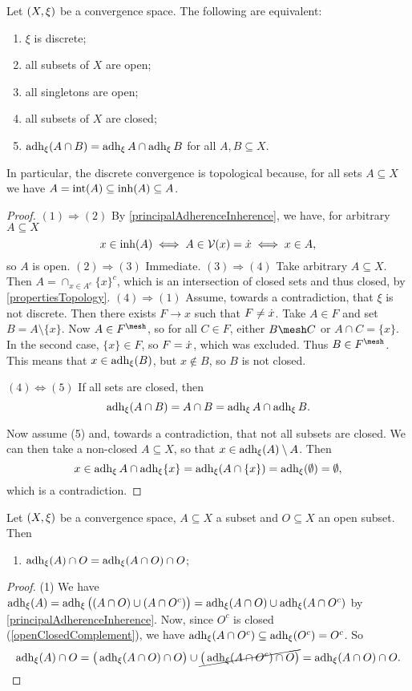 \begin{proposition} \label{discreteTopologyCharacterisation}
Let $\sSet{X,\xi}$ be a convergence space. The following are equivalent:
\begin{enumerate}
\item $\xi$ is discrete;
\item all subsets of $X$ are open;
\item all singletons are open;
\item all subsets of $X$ are closed;
\item $\operatorname{adh}_\xi(A\cap B) = \operatorname{adh}_\xi A \cap \operatorname{adh}_\xi B$ for all $A,B\subseteq X$.
\end{enumerate}
\end{proposition}
In particular, the discrete convergence is topological because, for all sets $A\subseteq X$ we have $A = \operatorname{int}(A) \subseteq \operatorname{inh}(A) \subseteq A$.
\begin{proof}
$(1) \Rightarrow (2)$ By \ref{principalAdherenceInherence}, we have, for arbitrary $A\subseteq X$
\[ x\in \operatorname{inh}(A) \iff A\in \operatorname{\mathcal{V}}(x) = \dot{x} \iff x\in A, \]
so $A$ is open.
$(2) \Rightarrow (3)$ Immediate.
$(3) \Rightarrow (4)$ Take arbitrary $A\subseteq X$. Then $A = \cap_{x\in A^c}\{x\}^c$, which is an intersection of closed sets and thus closed, by \ref{propertiesTopology}.
$(4) \Rightarrow (1)$ Assume, towards a contradiction, that $\xi$ is not discrete. Then there exists $F\to x$ such that $F \neq \dot{x}$. Take $A\in F$ and set $B = A\setminus\{x\}$. Now $A\in F^\mesh$, so for all $C\in F$, either $B\mesh C$ or $A\cap C = \{x\}$. In the second case, $\{x\}\in F$, so $F = \dot{x}$, which was excluded. Thus $B\in F^\mesh$. This means that $x\in \operatorname{adh}_\xi(B)$, but $x\notin B$, so $B$ is not closed. 

$(4) \Leftrightarrow (5)$ If all sets are closed, then
\[ \operatorname{adh}_\xi(A\cap B) = A\cap B = \operatorname{adh}_\xi A \cap \operatorname{adh}_\xi B. \]

Now assume (5) and, towards a contradiction, that not all subsets are closed. We can then take a non-closed $A\subseteq X$, so that $x\in \operatorname{adh}_\xi(A)\setminus A$. Then
\[ x\in \operatorname{adh}_\xi A \cap \operatorname{adh}_\xi \{x\} = \operatorname{adh}_\xi(A\cap\{x\}) = \operatorname{adh}_\xi(\emptyset) = \emptyset, \]
which is a contradiction.
\end{proof}

\begin{lemma} \label{openClosedSetLemma}
Let $\sSet{X,\xi}$ be a convergence space, $A\subseteq X$ a subset and $O\subseteq X$ an open subset. Then
\begin{enumerate}
\item $\operatorname{adh}_\xi(A)\cap O = \operatorname{adh}_\xi(A\cap O)\cap O$;
\end{enumerate}
\end{lemma}
\begin{proof}
(1) We have $\operatorname{adh}_\xi(A) = \operatorname{adh}_\xi\big((A\cap O) \cup (A\cap O^c)\big) = \operatorname{adh}_\xi(A\cap O) \cup \operatorname{adh}_\xi(A\cap O^c)$ by \ref{principalAdherenceInherence}. Now, since $O^c$ is closed (\ref{openClosedComplement}), we have $\operatorname{adh}_\xi(A\cap O^c) \subseteq \operatorname{adh}_\xi(O^c) = O^c$. So
\[ \operatorname{adh}_\xi(A)\cap O = \big(\operatorname{adh}_\xi(A\cap O)\cap O\big) \cup \cancel{\big(\operatorname{adh}_\xi(A\cap O^c)\cap O\big)} = \operatorname{adh}_\xi(A\cap O)\cap O. \]
\end{proof}

